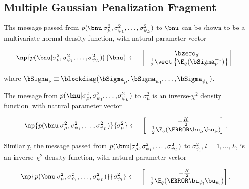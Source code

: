 \documentclass[ba]{imsart}
\numberwithin{equation}{section}
\theoremstyle{plain}
\def\Sigmanu{\bSigma_{\nu}}
\def\sigsqmu{\sigma^2_{\mu}}
\def\umu{\bu_\mu}
\newcommand\upsi[1]{\bu_{\psi_{#1}}}
\newcommand\sigsqpsi[1]{\sigma^2_{\psi_{#1}}}
\begin{document}
\subsection{Multiple Gaussian Penalization Fragment}
\label{sec:mean_fpc_gauss_pen_frag}

The message passed from $p (\bnu | \sigsqmu, \sigsqpsi{1}, \dots, \sigsqpsi{L})$ to $\bnu$ can be shown to
be a multivariate normal density function, with natural parameter vector

\begin{equation}
	\np{p (\bnu | \sigsqmu, \sigsqpsi{1}, \dots, \sigsqpsi{L})}{\bnu}
		\longleftarrow
			\begin{bmatrix}
				\bzero_{d} \\
				-\frac12 \vect \left\{ \E_q (\Sigmanu^{-1}) \right\}
			\end{bmatrix},
\label{np_pen_nu}
\end{equation}

\noindent where $\Sigmanu \equiv \blockdiag (\bSigma_\mu, \bSigma_{\psi_1}, \dots, \bSigma_{\psi_L})$.

The message from $p (\bnu | \sigsqmu, \sigsqpsi{1}, \dots, \sigsqpsi{L})$ to $\sigsqmu$ is an inverse-$\chi^2$
density function, with natural parameter vector

\begin{equation}
	\np{p (\bnu | \sigsqmu, \sigsqpsi{1}, \dots, \sigsqpsi{L})}{\sigsqmu}
		\longleftarrow
			\begin{bmatrix}
				-\frac{K}{2} \\
				-\frac12 \E_q (\T{\umu} \umu)
			\end{bmatrix}.
\label{np_pen_sigsqmu}
\end{equation}

Similarly, the message passed from $p (\bnu | \sigsqmu, \sigsqpsi{1}, \dots, \sigsqpsi{L})$ to $\sigsqpsi{l}$,
$l = 1, \dots, L$, is an inverse-$\chi^2$ density function, with natural parameter vector

\begin{equation}
	\np{p (\bnu | \sigsqmu, \sigsqpsi{1}, \dots, \sigsqpsi{L})}{\sigsqpsi{l}}
		\longleftarrow
			\begin{bmatrix}
				-\frac{K}{2} \\
				-\frac12 \E_q (\T{\upsi{l}} \upsi{l})
			\end{bmatrix}.
\label{np_pen_sigsqpsi}
\end{equation}
\end{document}
